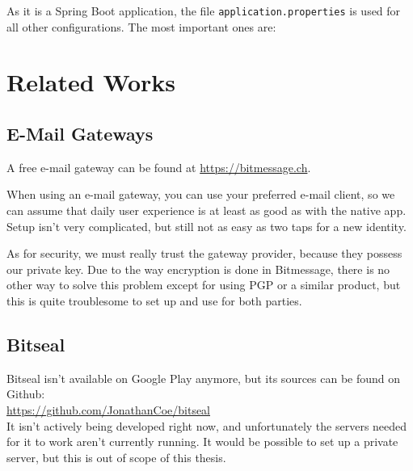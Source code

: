 \documentclass{bfh}
\begin{document}
  As it is a Spring Boot application, the file \texttt{application.properties} is used for all other configurations. The most important ones are:


  \newpage
  \section{Related Works}
  \subsection{E-Mail Gateways}
  A free e-mail gateway can be found at \url{https://bitmessage.ch}.

  When using an e-mail gateway, you can use your preferred e-mail client, so we can assume that daily user experience is at least as good as with the native app. Setup isn't very complicated, but still not as easy as two taps for a new identity.

  As for security, we must really trust the gateway provider, because they possess our private key. Due to the way encryption is done in Bitmessage, there is no other way to solve this problem except for using \ac{PGP} or a similar product, but this is quite troublesome to set up and use for both parties.


  \subsection{Bitseal}
  Bitseal isn't available on Google Play anymore, but its sources can be found on Github:\\
  \url{https://github.com/JonathanCoe/bitseal}\\
  It isn't actively being developed right now, and unfortunately the servers needed for it to work aren't currently running. It would be possible to set up a private server, but this is out of scope of this thesis.
\end{document}

